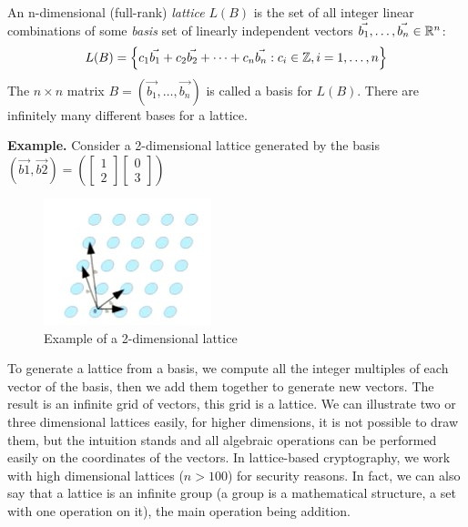 \begin{definition}[Lattice]
  An n-dimensional (full-rank) \emph{lattice} $L(B)$ is the set of all integer
  linear combinations of some \emph{basis} set of linearly independent vectors
  $\vec{b_1},\dots,\vec{b_n} \in \mathbb{R}^n$:
  \[
    L(B) = \left\{ c_1 \vec{b_1} + c_2 \vec{b_2} + \dots + c_n \vec{b_n} : c_i
      \in \mathbb{Z}, i = 1, \dots, n \right\}
  \]
  The $ n \times n$ matrix $B = (\vec{b_1},\dots, \vec{b_n})$ is called a basis
  for $L(B)$. There are infinitely many different bases for a lattice.
\end{definition}

\textbf{Example.} Consider a 2-dimensional lattice generated by the basis
$(\vec{b1}, \vec{b2}) = \left( \begin{bmatrix} 1 \\ 2
  \end{bmatrix} \begin{bmatrix} 0 \\ 3
  \end{bmatrix}\right)$
\begin{figure}[h]
  \centering \includegraphics{lattices}
  \caption{Example of a 2-dimensional lattice}
  \label{fig:2dimLattice}
\end{figure}
To generate a lattice from a basis, we compute all the integer multiples of
each vector of the basis, then we add them together to generate new vectors. The
result is an infinite grid of vectors, this grid is a lattice. We can illustrate
two or three dimensional lattices easily, for higher dimensions, it is not
possible to draw them, but the intuition stands and all 
algebraic operations can be performed easily on the coordinates of the vectors. In
lattice-based cryptography, we work with high dimensional lattices ($n > 100$) for
security reasons. In fact, we can also say that a lattice is an infinite
group (a group is a mathematical structure, a set with one operation on it),
the main operation being addition.


